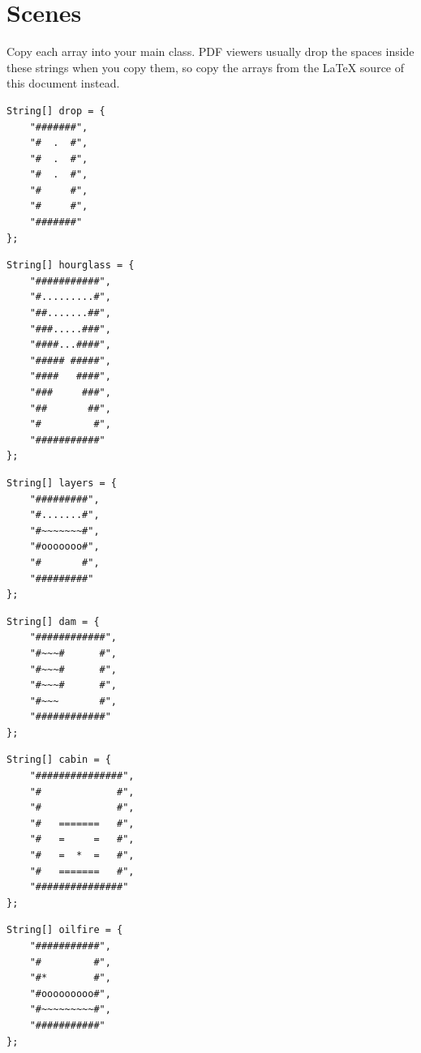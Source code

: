 \documentclass[11pt,a4paper]{article}
\begin{document}
\appendix
\section{Scenes}\label{app:scenes}

Copy each array into your main class. PDF viewers usually drop the spaces inside these strings
when you copy them, so copy the arrays from the \LaTeX{} source of this document instead.

\noindent
\begin{minipage}[t]{0.32\linewidth}
\begin{lstlisting}
String[] drop = {
    "#######",
    "#  .  #",
    "#  .  #",
    "#  .  #",
    "#     #",
    "#     #",
    "#######"
};
\end{lstlisting}
\end{minipage}\hfill
\begin{minipage}[t]{0.32\linewidth}
\begin{lstlisting}
String[] hourglass = {
    "###########",
    "#.........#",
    "##.......##",
    "###.....###",
    "####...####",
    "##### #####",
    "####   ####",
    "###     ###",
    "##       ##",
    "#         #",
    "###########"
};
\end{lstlisting}
\end{minipage}\hfill
\begin{minipage}[t]{0.32\linewidth}
\begin{lstlisting}
String[] layers = {
    "#########",
    "#.......#",
    "#~~~~~~~#",
    "#ooooooo#",
    "#       #",
    "#########"
};
\end{lstlisting}
\end{minipage}

\noindent
\begin{minipage}[t]{0.32\linewidth}
\begin{lstlisting}
String[] dam = {
    "############",
    "#~~~#      #",
    "#~~~#      #",
    "#~~~#      #",
    "#~~~       #",
    "############"
};
\end{lstlisting}
\end{minipage}\hfill
\begin{minipage}[t]{0.32\linewidth}
\begin{lstlisting}
String[] cabin = {
    "###############",
    "#             #",
    "#             #",
    "#   =======   #",
    "#   =     =   #",
    "#   =  *  =   #",
    "#   =======   #",
    "###############"
};
\end{lstlisting}
\end{minipage}\hfill
\begin{minipage}[t]{0.32\linewidth}
\begin{lstlisting}
String[] oilfire = {
    "###########",
    "#         #",
    "#*        #",
    "#ooooooooo#",
    "#~~~~~~~~~#",
    "###########"
};
\end{lstlisting}
\end{minipage}
\end{document}
